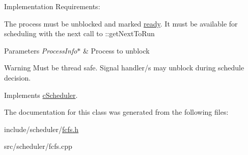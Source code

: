 \-Implementation \-Requirements\-: \begin{DoxyItemize}
\item \-The process must be unblocked and marked \hyperlink{process_8h_a2c72cb00af5be695c1f898162350821fa3d4001ca586c857718be397374082d76}{ready}. \-It must be available for scheduling with the next call to \-::get\-Next\-To\-Run\end{DoxyItemize}

\begin{DoxyParams}{\-Parameters}
{\em \-Process\-Info$\ast$} & \-Process to unblock\\
\hline
\end{DoxyParams}
\begin{DoxyWarning}{\-Warning}
\-Must be thread safe. \-Signal handler/s may unblock during schedule decision. 
\end{DoxyWarning}


\-Implements \hyperlink{classcScheduler_a81fe2e5e5e2334e36db1cbf491e3fa57}{c\-Scheduler}.



\-The documentation for this class was generated from the following files\-:\begin{DoxyCompactItemize}
\item 
include/scheduler/\hyperlink{fcfs_8h}{fcfs.\-h}\item 
src/scheduler/fcfs.\-cpp\end{DoxyCompactItemize}
